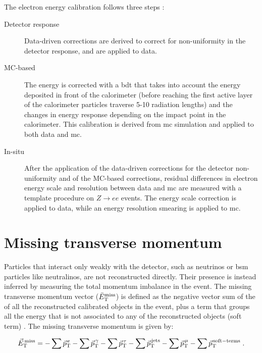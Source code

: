 The electron energy calibration follows three steps \cite{Aad:2014nim,ATL-PHYS-PUB-2016-015}:
\begin{description}
\item[Detector response] Data-driven corrections are derived to correct for non-uniformity in the detector response, and are applied to data.
 
\item[MC-based] The energy is corrected with a \gls{bdt} that takes into account the energy deposited in front of the calorimeter (before reaching the first active layer of the calorimeter particles traverse 5-10 radiation lengths) and the changes in energy response depending on the impact point in the calorimeter.
This calibration is derived from \gls{mc} simulation and applied to both data and \gls{mc}. 

\item[In-situ] After the application of the data-driven corrections for the detector non-uniformity and of the MC-based corrections, 
residual differences in electron energy scale and resolution between data and \gls{mc} are measured with a template procedure on $Z\rightarrow e e$ events. The energy scale correction is applied to data, while an energy resolution smearing is applied to \gls{mc}.

\end{description}



\section{Missing transverse momentum}
\label{sec:met}

Particles that interact only weakly with the detector, such as neutrinos or \gls{bsm} particles like neutralinos, are not reconstructed directly.  
Their presence is instead inferred by measuring the total momentum imbalance in the event. 
The missing transverse momentum vector ($\bar{E}_{\rm{T}}^{\rm{miss}}$) is defined as the negative vector sum of the \pt of all the reconstructed calibrated objects in the event, 
plus a term that groups all the energy that is not associated to any of the reconstructed objects (soft term) \cite{Aad:2016nrq,Aaboud:2018tkc,ATLAS-CONF-2018-023}. 
The missing transverse momentum is given by:

\begin{equation}
\vec{E}_{\rm{T}}^{\,\rm{miss}}=  - \sum \vec{p}_{\rm{T}} ^{\,e}  - \sum \vec{p}_{\rm{T}} ^{\,\gamma} - \sum \vec{p}_{\rm{T}} ^{\,\tau}    \nonumber \\
- \sum \vec{p}_{\rm{T}} ^{\,\rm{jets}} - \sum \vec{p}_{\rm{T}}   ^{\,\mu} - \sum \vec{p}_{\rm{T}}  ^{\,\rm{soft-terms}}   \; .
\label{eq:etm} 
\end{equation}

